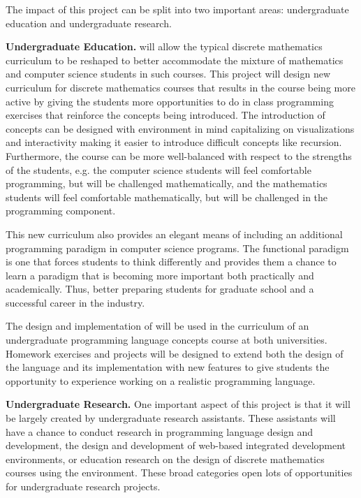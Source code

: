 The impact of this project can be split into two important areas:
undergraduate education and undergraduate research.

\textbf{Undergraduate Education.}  \thelang{} will allow the typical
discrete mathematics curriculum to be reshaped to better accommodate
the mixture of mathematics and computer science students in such
courses.  This project will design new curriculum for discrete
mathematics courses that results in the course being more active by
giving the students more opportunities to do in class programming
exercises that reinforce the concepts being introduced.  The
introduction of concepts can be designed with \thelang{} environment
in mind capitalizing on visualizations and interactivity making it
easier to introduce difficult concepts like recursion.  Furthermore,
the course can be more well-balanced with respect to the strengths of
the students, e.g. the computer science students will feel comfortable
programming, but will be challenged mathematically, and the
mathematics students will feel comfortable mathematically, but will be
challenged in the programming component.

This new curriculum also provides an elegant means of including an
additional programming paradigm in computer science programs.  The
functional paradigm is one that forces students to think differently
and provides them a chance to learn a paradigm that is becoming more
important both practically and academically.  Thus, better preparing
students for graduate school and a successful career in the industry.

The design and implementation of \thelang{} will be used in the
curriculum of an undergraduate programming language concepts course at
both universities.  Homework exercises and projects will be designed
to extend both the design of the language and its implementation with
new features to give students the opportunity to experience working on
a realistic programming language.

\textbf{Undergraduate Research.} One important aspect of this project
is that it will be largely created by undergraduate research
assistants.  These assistants will have a chance to conduct research
in programming language design and development, the design and
development of web-based integrated development environments, or
education research on the design of discrete mathematics courses using
the \thelang{} environment.  These broad categories open lots of
opportunities for undergraduate research projects.

